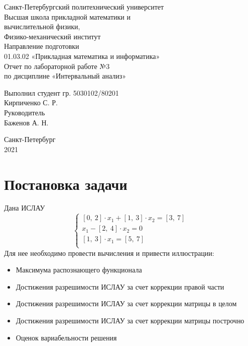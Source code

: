 \documentclass[a4paper]{article}
\begin{document}
\large
\begin{center}
    Санкт-Петербургский политехнический университет\\
    Высшая школа прикладной математики и\\вычислительной физики,\\ 
    Физико-механический институт\\
    \vspace{3em}
    Направление подготовки\\
    01.03.02 «Прикладная математика и информатика»\\
    \vspace{10em}
    \Large
    Отчет по лабораторной работе №3 \\
    по дисциплине «Интервальный анализ»
    \vspace{19em}
    \large
\end{center}
Выполнил студент гр. 5030102/80201\\
Кирпиченко С. Р.\\
Руководитель\\
Баженов А. Н.
\vspace{10em}
\begin{center}
    Санкт-Петербург\\
    2021
\end{center}
\thispagestyle{empty}
\newpage
\tableofcontents
{}
\newpage
\listoffigures
{}
\newpage
\section{Постановка задачи}
Дана ИСЛАУ 
\begin{equation}\label{islau}
    \begin{cases}
    [0,\:2]\cdot x_1+[1,\:3]\cdot x_2=[3,\:7]\\
    x_1 - [2,\:4]\cdot x_2=0\\
    [1,\:3]\cdot x_1=[5,\:7]\\
    \end{cases}
\end{equation}
Для нее необходимо провести вычисления и привести иллюстрации:
\begin{itemize}
    \item Максимума распознающего функционала
    \item Достижения разрешимости ИСЛАУ за счет коррекции правой части
    \item Достижения разрешимости ИСЛАУ за счет коррекции матрицы в целом
    \item Достижения разрешимости ИСЛАУ за счет коррекции матрицы построчно
    \item Оценок вариабельности решения
\end{itemize}
\end{document}
